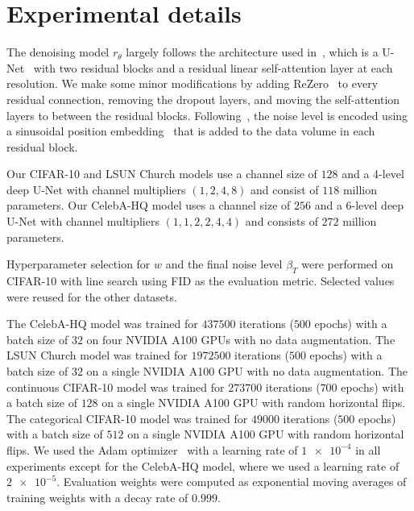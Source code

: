 \documentclass[10pt,twocolumn,letterpaper]{article}
\begin{document}
{\printbibliography}

\appendix
\onecolumn

\section{Experimental details}\label{app:implementation}

The denoising model $r_{\theta}$ largely follows the architecture used in~\textcite{hoogeboom2021argmax}, which is a U-Net~\cite{ronneberger2015u} with two residual blocks and a residual linear self-attention layer at each resolution.
We make some minor modifications by adding ReZero~\cite{bachlechner21rezero} to every residual connection, removing the dropout layers, and moving the self-attention layers to between the residual blocks.
Following~\cite{ho2020denoising}, the noise level is encoded using a sinusoidal position embedding~\cite{vaswani17attention} that is added to the data volume in each residual block.

Our CIFAR-10 and LSUN Church models use a channel size of $128$ and a 4-level deep U-Net with channel multipliers $(1, 2, 4, 8)$ and consist of $118$ million parameters.
Our CelebA-HQ model uses a channel size of $256$ and a 6-level deep U-Net with channel multipliers $(1, 1, 2, 2, 4, 4)$ and consists of $272$ million parameters.

Hyperparameter selection for $w$ and the final noise level $\beta_{T}$ were performed on CIFAR-10 with line search using FID as the evaluation metric.
Selected values were reused for the other datasets.

The CelebA-HQ model was trained for $\num{437500}$ iterations ($500$ epochs) with a batch size of $32$ on four NVIDIA A100 GPUs with no data augmentation.
The LSUN Church model was trained for $\num{1972500}$ iterations ($500$ epochs) with a batch size of $32$ on a single NVIDIA A100 GPU with no data augmentation.
The continuous CIFAR-10 model was trained for $\num{273700}$ iterations ($700$ epochs) with a batch size of $128$ on a single NVIDIA A100 GPU with random horizontal flips.
The categorical CIFAR-10 model was trained for $\num{49000}$ iterations ($500$ epochs) with a batch size of $512$ on a single NVIDIA A100 GPU with random horizontal flips.
We used the Adam optimizer~\cite{kingma2014adam} with a learning rate of $\num{1e-4}$ in all experiments except for the CelebA-HQ model, where we used a learning rate of $\num{2e-5}$.
Evaluation weights were computed as exponential moving averages of training weights with a decay rate of $\num{0.999}$.
\end{document}
